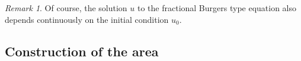 \documentclass[11pt,a4paper]{article}
\newcommand{\cdummy}{\cdot}
\theoremstyle{remark}
\newtheorem{remark}[theorem]{Remark}
\newcommand{\CC}{\ensuremath{\mathscr{C}}}
\begin{document}

\begin{remark}
   Of course, the solution $u$ to the fractional Burgers type equation also depends continuously on the initial condition $u_0$.
\end{remark}






\subsection{Construction of the area}
\end{document}
